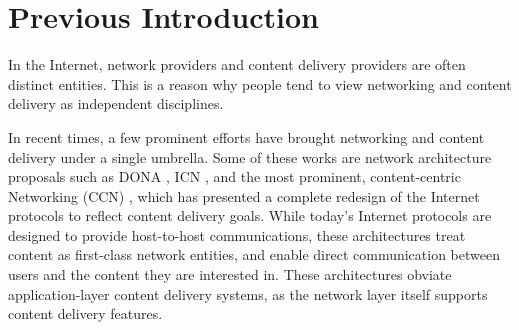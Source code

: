  

\chapter{Previous Introduction}



In the Internet, network providers and content delivery providers are often distinct entities. 
This is a reason why people tend to view networking and content delivery as independent disciplines. 



In recent times, a few prominent efforts have brought networking and content delivery under a single umbrella. Some of these works are network architecture proposals such as DONA \cite{DONA}, ICN \cite{Ghodsi} ,  and the most prominent, content-centric Networking (CCN) \cite{CCN}, which has presented a complete redesign of the Internet protocols to reflect content delivery goals. 
While today's Internet protocols are designed to provide host-to-host communications, these architectures treat content as first-class network entities, and enable direct communication between users and the content they are interested in.
These architectures obviate  application-layer content delivery systems, as the network layer itself supports content delivery features.

